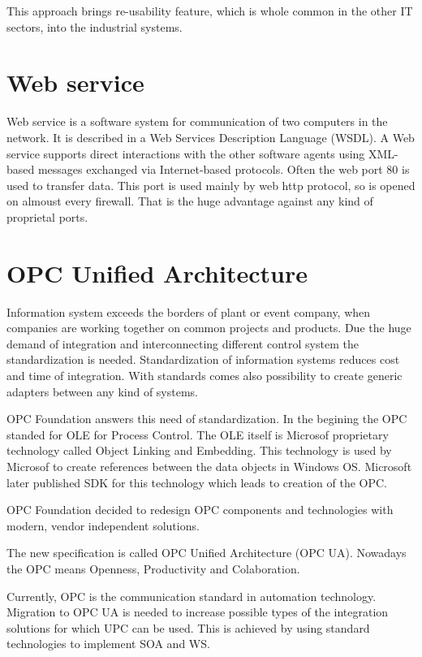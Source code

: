 This approach brings re-usability feature, which is whole common in the other IT sectors, into the industrial systems.


\section{Web service}


Web service is a software system for communication of two computers in the network. It is described in a Web Services Description Language (WSDL). A Web service supports direct interactions with the other software agents using XML-based messages exchanged via Internet-based protocols. \cite{raey} Often the web port 80 is used to transfer data. This port is used mainly by web http protocol, so is opened on almoust every firewall. That is the huge advantage against any kind of proprietal ports. 


\section{OPC Unified Architecture}

Information system exceeds the borders of plant or event company, when companies are working together on common projects and products.
Due the huge demand of integration and interconnecting different control system the standardization is needed. Standardization of information systems reduces cost and time of integration. With standards comes also possibility to create generic adapters between any kind of systems. 

OPC Foundation answers this need of standardization. 
In the begining the OPC standed for OLE for Process Control. The OLE itself is Microsof proprietary technology called Object Linking and Embedding. This technology is used by Microsof to create references between the data objects in Windows OS. Microsoft later published SDK for this technology which leads to creation of the OPC. 

OPC Foundation decided to redesign OPC components and technologies with modern, vendor independent solutions.\cite{4618203}


The new specification is called OPC Unified Architecture (OPC UA). Nowadays the OPC means Openness, Productivity and Colaboration.


Currently, OPC is the communication standard in automation technology. Migration to OPC UA is needed to increase possible types of the integration solutions for which UPC can be used. This is achieved by using standard technologies to implement SOA and WS. 

